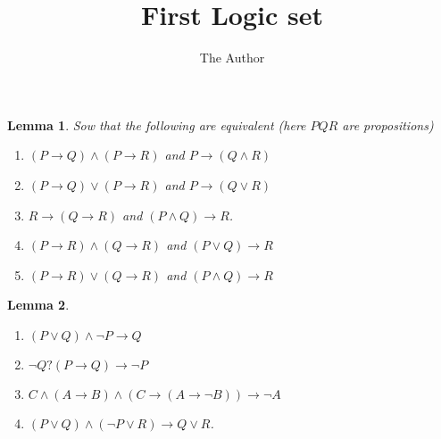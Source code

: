 \documentclass[11pt, oneside]{article}   	%
\title{First Logic set}
\author{The Author}
\newtheorem{lemma}{Lemma}
\begin{document}
\maketitle

\begin{lemma}
Sow that the following are equivalent (here $P Q R$ are propositions)
\begin{enumerate}	
\item $(P \rightarrow Q) \land (P \rightarrow R)$ and $P \rightarrow (Q\land R)$
\item $(P \rightarrow Q) \lor (P \rightarrow R)$ and $P \rightarrow (Q\lor R)$

\item $R\rightarrow(Q\rightarrow R)$ and $(P\land Q) \rightarrow R$.
\item $(P \rightarrow R) \land (Q \rightarrow R)$ and $(P \lor Q) \rightarrow R$
\item $(P \rightarrow R) \lor (Q \rightarrow R)$ and $(P \land Q) \rightarrow R$
\end{enumerate}


\end{lemma}

\begin{lemma}

\begin{enumerate}
\item $(P \lor Q) \land \neg  P \rightarrow Q$
\item $\neg Q ? (P \rightarrow Q) \rightarrow  \neg P$
\item $ C \land (A \rightarrow B) \land (C \rightarrow ( A \rightarrow \neg B)) \rightarrow \neg A$
\item $ (P \lor  Q) \land (\neg P \lor R) \rightarrow Q \lor R$.
\end{enumerate}

\end{lemma}
\end{document}
